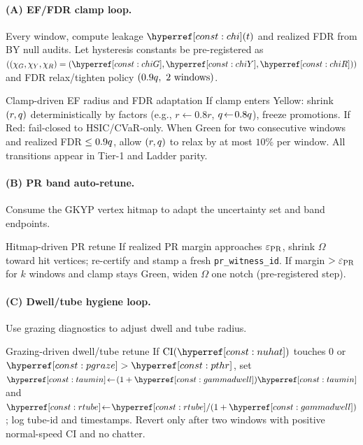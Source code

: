\paragraph{(A) EF/FDR clamp loop.}
Every window, compute leakage $\constref{chi}(t)$ and realized FDR from BY null audits. Let hysteresis constants be pre-registered as
$(
(\chi_G,\chi_Y,\chi_R)=(\constref{chiG},\constref{chiY},\constref{chiR})
)$
and FDR relax/tighten policy $(0.9q,\ 2\text{ windows})$.

\begin{rulex}{Clamp-driven EF radius and FDR adaptation}\label{rule:clamp-adapt}
If clamp enters Yellow: shrink $(r,q)$ deterministically by factors (e.g., $r\!\leftarrow\!0.8r$, $q\!\leftarrow\!0.8q$), freeze promotions. If Red: fail-closed to HSIC/CVaR-only. When Green for two consecutive windows and realized FDR $\le 0.9q$, allow $(r,q)$ to relax by at most $10\%$ per window. All transitions appear in Tier-1 and Ladder parity.
\end{rulex}

\paragraph{(B) PR band auto-retune.}
Consume the GKYP vertex hitmap to adapt the uncertainty set and band endpoints.

\begin{rulex}{Hitmap-driven PR retune}\label{rule:pr-retune}
If realized PR margin approaches $\varepsilon_{\mathrm{PR}}$, shrink $\Omega$ toward hit vertices; re-certify and stamp a fresh \texttt{pr\_witness\_id}. If margin $>\varepsilon_{\mathrm{PR}}$ for $k$ windows and clamp stays Green, widen $\Omega$ one notch (pre-registered step).
\end{rulex}

\paragraph{(C) Dwell/tube hygiene loop.}
Use grazing diagnostics to adjust dwell and tube radius.

\begin{rulex}{Grazing-driven dwell/tube retune}\label{rule:dwell-retune}
If $\mathrm{CI}(\constref{nuhat})$ touches $0$ or $\constref{pgraze}>\constref{pthr}$, set $\constref{taumin}\!\leftarrow\!(1+\constref{gammadwell})\constref{taumin}$ and $\constref{rtube}\!\leftarrow\!\constref{rtube}/(1+\constref{gammadwell})$; log tube-id and timestamps. Revert only after two windows with positive normal-speed CI and no chatter.
\end{rulex}

